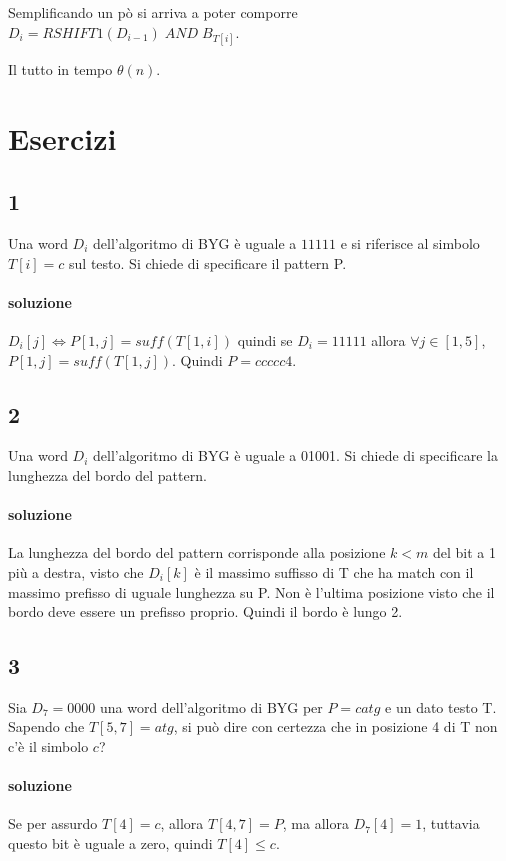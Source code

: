 Semplificando un p\`o si arriva a poter comporre $D_i = RSHIFT1(D_{i-1}) \; AND \; B_{T[i]}$.

Il tutto in tempo $\theta(n)$.

\section{Esercizi}

\subsection{1}

Una word $D_i$ dell'algoritmo di BYG è uguale a $11111$ e si riferisce al simbolo $T[i]=c$ sul testo. Si chiede di specificare il pattern P.

\paragraph{soluzione} $D_i[j] \Leftrightarrow P[1,j] = suff(T[1,i])$ quindi se $D_i = 11111$ allora $\forall j \in [1,5]$, $P[1,j] = suff(T[1,j])$. Quindi $P = ccccc4$.

\subsection{2}

Una word $D_i$ dell'algoritmo di BYG \`e uguale a 01001. Si chiede di specificare la lunghezza del bordo del pattern.

\paragraph{soluzione} La lunghezza del bordo del pattern corrisponde alla posizione $k < m$ del bit a 1 pi\`u a destra, visto che $D_i[k]$ \`e il massimo suffisso di T che ha match con il massimo prefisso di uguale lunghezza su P. Non \`e l'ultima posizione visto che il bordo deve essere un prefisso proprio. Quindi il bordo \`e lungo 2.

\subsection{3}

Sia $D_7 = 0000$ una word dell’algoritmo di BYG per $P=catg$ e un dato testo T. Sapendo che $T[5,7] = atg$, si pu\`o dire con certezza che in posizione 4 di T non c'\`e il simbolo $c$?

\paragraph{soluzione} Se per assurdo $T[4] = c$, allora $T[4,7] = P$, ma allora $D_7[4] = 1$, tuttavia questo bit \`e uguale a zero, quindi $T[4] \leq c$.


